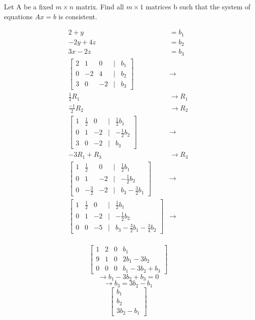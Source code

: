 \begin{example}
	Let A be a fixed $m \times n $ matrix. Find all $m\times 1$ matrices b such that
	the system of equations $Ax = b$ is consistent.

	\begin{align*}
		 2 + y &=  b_1 \\
		 -2y + 4z &= b_2 \\
		 3x -2z &=   b_3\\
		 \begin{bmatrix}  2 & 1 & 0 & | & b_1 \\0 & -2 & 4  & | & b_2 \\ 3 & 0 & -2 & | & b_3 \end{bmatrix} &\to \\
		 \frac{1}{2} R_1 &\to R_1 \\
		 \frac{-1}{2} R_2 &\to R_2 \\
		 \begin{bmatrix}  1 & \frac{1}{2} & 0 & | &\frac{1}{2} b_1 \\0 & 1 & -2  & | & -\frac{1}{2}b_2 \\ 3 & 0 & -2 & | & b_3 \end{bmatrix} &\to \\
		 -3 R_1 + R_3 &\to R_3 \\
		 \begin{bmatrix}  1 & \frac{1}{2} & 0 & | &\frac{1}{2} b_1 \\0 & 1 & -2  & | & -\frac{1}{2}b_2 \\ 0 & -\frac{3}{2} & -2 & | & b_3 - \frac{3}{2}b_1 \end{bmatrix} &\to \\
		 \begin{bmatrix}  1 & \frac{1}{2} & 0 & | &\frac{1}{2} b_1 \\0 & 1 & -2  & | & -\frac{1}{2}b_2 \\ 0 & 0 & -5 & | & b_3 - \frac{3}{2}b_1 - \frac{3}{4} b_2 \end{bmatrix} &\to \\
	\end{align*}
\end{example}

\begin{example}
	\[\begin{bmatrix} 1 & 2 & 0 & b_1 \\ 9 & 1 & 0 & 2b_1 - 3b_2\\ 0 & 0 & 0 & b_1 - 3b_2 + b_3 \end{bmatrix} \]
	\[\to b_1 - 3b_2 + b_3 = 0\]
	\[\to   b_3 =  3b_2 - b_1 \]
	\[\boxed{\begin{bmatrix} b_1 \\ b_2 \\ 3b_2 - b_1 \end{bmatrix} }\]
\end{example}






\newpage


